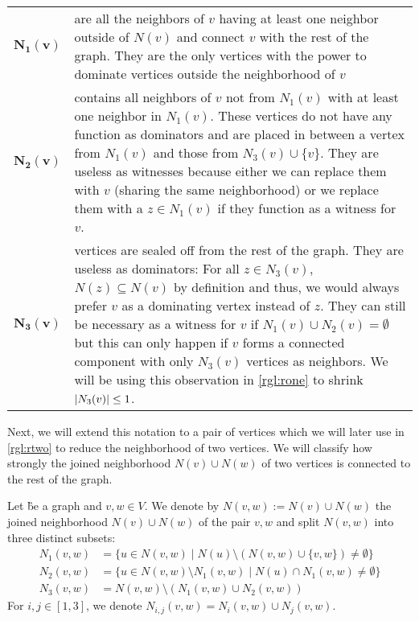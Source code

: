 \begin{xltabular}{\textwidth}{lX}
\textbf{$\mathbf{N_1(v)}$} & are all the neighbors of $v$ having at least one neighbor outside of $N(v)$ and connect $v$ with the rest of the graph. 
They are the only vertices with the power to dominate vertices outside the neighborhood of $v$ \\

\textbf{$\mathbf{N_2(v)}$} & contains all neighbors of $v$ not from $N_1(v)$ with at least one neighbor in $N_1(v)$. 
These vertices do not have any function as dominators and are placed in between a vertex from $N_1(v)$ and those from  $N_3(v) \cup \{ v \}$. 
They are useless as witnesses because either we can replace them with $v$ (sharing the same neighborhood) or we replace them with a $z \in N_1(v)$ if they function as a witness for $v$. \\

\textbf{$\mathbf{N_3(v)}$} & vertices are sealed off from the rest of the graph. 
They are useless as dominators: For all $z \in N_3(v)$, $N(z) \subseteq N(v)$ by definition and thus, we would always prefer $v$ as a dominating vertex instead of $z$. 
They can still be necessary as a witness for $v$ if $N_1(v) \cup N_2(v) =\emptyset$ but this can only happen if $v$ forms a connected component with only $N_3(v)$ vertices as neighbors. 
We will be using this observation in \cref{rgl:rone} to shrink $\abs{N_3(v)} \leq 1$.
\end{xltabular}

Next, we will extend this notation to a pair of vertices which we will later use in  \cref{rgl:rtwo} to reduce the neighborhood of two vertices. We will classify how strongly the joined neighborhood $N(v) \cup N(w)$ of two vertices is connected to the rest of the graph.

\begin{definition}
    Let \G be a graph and $v,w \in V$. We denote by $N(v,w) := N(v) \cup N(w)$ the joined neighborhood $N(v) \cup N(w)$ of the pair $v,w$ and split $N(v,w)$ into three distinct subsets:
    \begin{align}
        N_1(v,w) & = \{u \in N(v,w) \mid N(u) \setminus (N(v,w)\cup \{v,w\}) \neq \emptyset \}  \\
        N_2(v,w) & = \{u \in N(v,w)\setminus N_1(v,w) \mid N(u) \cap N_1(v,w) \neq \emptyset \} \\
        N_3(v,w) & =  N(v,w) \setminus (N_1(v,w) \cup N_2(v,w))
    \end{align}
    For $i,j \in [1,3]$, we denote $N_{i,j}(v,w) = N_i(v,w) \cup N_j(v,w)$.
\end{definition}

